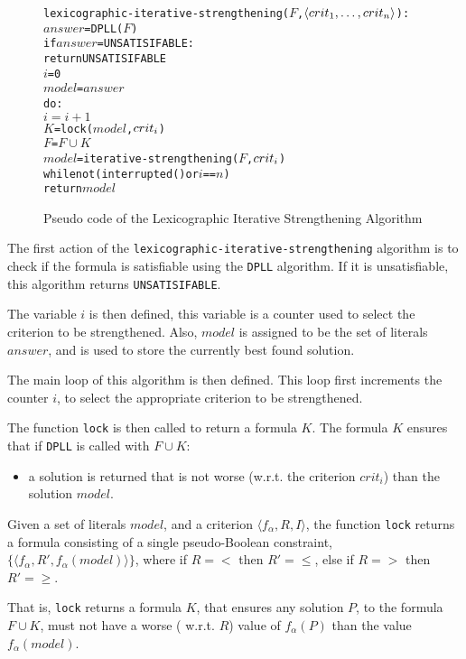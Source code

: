 \begin{figure}[htp]
\begin{center}
\begin{alltt}
lexicographic-iterative-strengthening(\(F\),\(\langle{}crit\sb{1}, \ldots ,crit\sb{n}\rangle\)):  
    \(answer\) = DPLL(\(F\))
    if \(answer\) = UNSATISIFABLE:
        return UNSATISIFABLE
    \(i\) = 0
    \(model\) = \(answer\)
    do:
        \(i = i + 1\)
        \(K\) = lock(\(model\),\(crit\sb{i}\))
        \(F\) = \(F \cup K\)
        \(model\) = iterative-strengthening(\(F\),\(crit\sb{i}\))
    while not (interrupted() or \(i\) == \(n\))
    return \(model\) 
\end{alltt}
  \caption{Pseudo code of the Lexicographic Iterative Strengthening Algorithm}
  \label{impl.lexstrength}
\end{center}
\end{figure}

The first action of the \texttt{lexicographic-iterative-strengthening} algorithm is to check if the formula is satisfiable using the \texttt{DPLL} algorithm.
If it is unsatisfiable, this algorithm returns \texttt{UNSATISIFABLE}.

The variable $i$ is then defined, this variable is a counter used to select the criterion to be strengthened.
Also, $model$ is assigned to be the set of literals $answer$, and is used to store the currently best found solution.

The main loop of this algorithm is then defined.
This loop first increments the counter $i$, to select the appropriate criterion to be strengthened.

The function \texttt{lock} is then called to return a formula $K$.
The formula $K$ ensures that if \texttt{DPLL} is called with $F \cup K$:
\begin{itemize}
  \item a solution is returned that is not worse (w.r.t. the criterion $crit_i$) than the solution $model$. 
\end{itemize}

\begin{defs}
Given a set of literals $model$, and a criterion $\langle f_{\alpha}, R, I \rangle$,
the function \texttt{lock} returns a formula consisting of a single pseudo-Boolean constraint, $\{ \langle f_{\alpha},R',f_{\alpha}(model) \rangle \}$,
where if $R = <$ then $R' = \leq$, else if $R = >$ then $R' = \geq$.
\end{defs}
That is, \texttt{lock} returns a formula $K$,
that ensures any solution $P$, to the formula $F \cup K$, must not have a worse ( w.r.t. $R$) value of $f_{\alpha}(P)$ than the value $f_{\alpha}(model)$.

